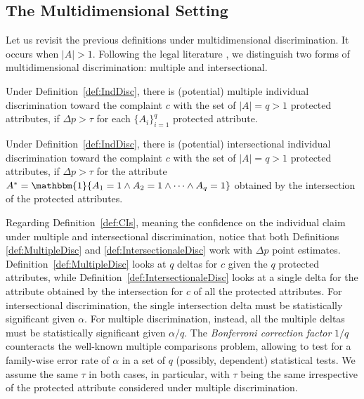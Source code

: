 \subsection{The Multidimensional Setting}
\label{sec:CST.Multi}

Let us revisit the previous definitions under multidimensional discrimination. 
It occurs when $|A| > 1$.
Following the legal literature \parencite{Xenidis2020_TunningEULaw}, we distinguish two forms of multidimensional discrimination: multiple and intersectional.

%
\begin{definition}
\label{def:MultipleDisc}
    Under Definition~\ref{def:IndDisc}, there is (potential) multiple individual discrimination toward the complaint $c$ with the set of $|A| = q > 1$ protected attributes, if $\Delta p > \tau$ for each $\{A_i\}_{i=1}^{q}$ protected attribute.
\end{definition}
%

%
\begin{definition}
\label{def:IntersectionaleDisc}
    Under Definition~\ref{def:IndDisc}, there is (potential) intersectional individual discrimination toward the complaint $c$ with the set of $|A| = q > 1$ protected attributes, if $\Delta p > \tau$ for the attribute $A^* = \mathbbm{1}\{ A_1=1 \wedge A_2=1 \wedge \dots \wedge A_q=1 \}$ obtained by the intersection of the protected attributes.
\end{definition}
%

Regarding Definition~\ref{def:CIs}, meaning the confidence on the individual claim under multiple and intersectional discrimination, notice that both Definitions \ref{def:MultipleDisc} and \ref{def:IntersectionaleDisc} work with $\Delta p$ point estimates. Definition~\ref{def:MultipleDisc} looks at $q$ deltas for $c$ given the $q$ protected attributes, while Definition~\ref{def:IntersectionaleDisc} looks at a single delta for the attribute obtained by the intersection for $c$ of all the protected attributes. For intersectional discrimination, the single intersection delta must be statistically significant given $\alpha$. For multiple discrimination, instead, all the multiple deltas must be statistically significant given $\alpha/q$. The \textit{Bonferroni correction factor} $1/q$ counteracts the well-known multiple comparisons problem, allowing to test for a family-wise error rate of $\alpha$ in a set of $q$ (possibly, dependent) statistical tests.
%
We assume the same $\tau$ in both cases, in particular, with $\tau$ being the same irrespective of the protected attribute considered under multiple discrimination.

